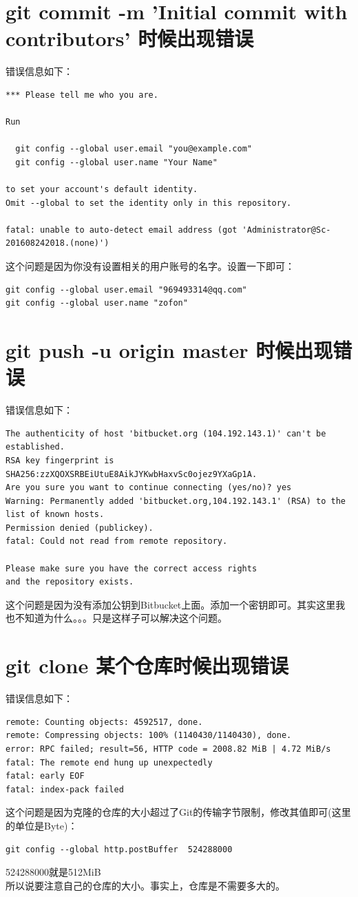 \documentclass[a4paper,12pt]{ctexbook}
\begin{document}
\section{git commit -m 'Initial commit with contributors' 时候出现错误}
错误信息如下：
\begin{verbatim}
*** Please tell me who you are.

Run

  git config --global user.email "you@example.com"
  git config --global user.name "Your Name"

to set your account's default identity.
Omit --global to set the identity only in this repository.

fatal: unable to auto-detect email address (got 'Administrator@Sc-201608242018.(none)')
\end{verbatim}
这个问题是因为你没有设置相关的用户账号的名字。设置一下即可：
\begin{verbatim}
git config --global user.email "969493314@qq.com"
git config --global user.name "zofon"
\end{verbatim}

\section{git push -u origin master 时候出现错误}
错误信息如下：
\begin{verbatim}
The authenticity of host 'bitbucket.org (104.192.143.1)' can't be established.
RSA key fingerprint is SHA256:zzXQOXSRBEiUtuE8AikJYKwbHaxvSc0ojez9YXaGp1A.
Are you sure you want to continue connecting (yes/no)? yes
Warning: Permanently added 'bitbucket.org,104.192.143.1' (RSA) to the list of known hosts.
Permission denied (publickey).
fatal: Could not read from remote repository.

Please make sure you have the correct access rights
and the repository exists.
\end{verbatim}
这个问题是因为没有添加公钥到Bitbucket上面。添加一个密钥即可。其实这里我也不知道为什么。。。只是这样子可以解决这个问题。

\section{git clone 某个仓库时候出现错误}
错误信息如下：
\begin{verbatim}
remote: Counting objects: 4592517, done.
remote: Compressing objects: 100% (1140430/1140430), done.
error: RPC failed; result=56, HTTP code = 2008.82 MiB | 4.72 MiB/s
fatal: The remote end hung up unexpectedly
fatal: early EOF
fatal: index-pack failed
\end{verbatim}
这个问题是因为克隆的仓库的大小超过了Git的传输字节限制，修改其值即可(这里的单位是Byte)：\\
\begin{verbatim}
git config --global http.postBuffer  524288000
\end{verbatim}
524288000就是512MiB\\
所以说要注意自己的仓库的大小。事实上，仓库是不需要多大的。
\end{document}
